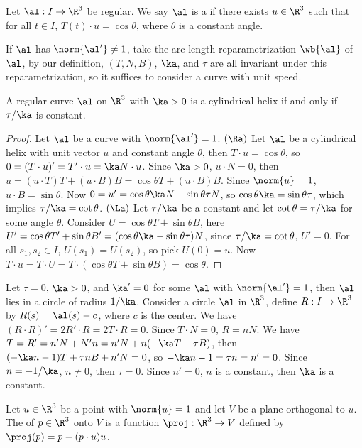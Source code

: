 \documentclass[10pt]{article}
\begin{document}
\begin{definition}
    Let $\al:I\to{\R}^{3}$ be regular. We say $\al$ is a  if there exists $u\in{\R}^{3}$ such that for all $t\in I$, $T(t)\cdot u=\cos\theta$, where $\theta$ is a constant angle.
\end{definition}
\par
If $\al$ has $\norm{\al'}\ne 1$, take the arc-length reparametrization $\wb{\al}$ of $\al$, by our definition, $(T,N,B)$, $\ka$, and $\tau$ are all invariant under this reparametrization, so it suffices to consider a curve with unit speed.
\begin{proposition}
    A regular curve $\al$ on ${\R}^{3}$ with $\ka>0$ is a cylindrical helix if and only if $\tau/\ka$ is constant.
\end{proposition}
\begin{proof}
    Let $\al$ be a curve with $\norm{\al'}=1$. $(\Ra)$ Let $\al$ be a cylindrical helix with unit vector $u$ and constant angle $\theta$, then $T\cdot u=\cos\theta$, so $0=(T\cdot u)'=T'\cdot u=\ka N\cdot u$. Since $\ka>0$, $u\cdot N=0$, then $u=(u\cdot T)T+(u\cdot B)B=\cos\theta T+(u\cdot B)B$. Since $\norm{u}=1$, $u\cdot B=\sin\theta$. Now $0=u'=\cos\theta\ka N-\sin\theta\tau N$, so $\cos\theta\ka=\sin\theta\tau$, which implies $\tau/\ka=\cot\theta$. $(\La)$ Let $\tau/\ka$ be a constant and let $\cot\theta=\tau/\ka$ for some angle $\theta$. Consider $U=\cos\theta T+\sin\theta B$, here $U'=\cos\theta T'+\sin\theta B'=(\cos\theta\ka-\sin\theta\tau)N$, since $\tau/\ka=\cot\theta$, $U'=0$. For all ${s}_{1},{s}_{2}\in I$, $U({s}_{1})=U({s}_{2})$, so pick $U(0)=u$. Now $T\cdot u=T\cdot U=T\cdot(\cos\theta T+\sin\theta B)=\cos\theta$.
\end{proof}
\par
Let $\tau=0$, $\ka>0$, and $\ka'=0$ for some $\al$ with $\norm{\al'}=1$, then $\al$ lies in a circle of radius $1/\ka$. Consider a circle $\al$ in ${\R}^{3}$, define $R:I\to{\R}^{3}$ by $R(s)=\al(s)-c$, where $c$ is the center. We have $(R\cdot R)'=2R'\cdot R=2T\cdot R=0$. Since $T\cdot N=0$, $R=nN$. We have $T=R'=n'N+N'n=n'N+n(-\ka T+\tau B)$, then $(-\ka n-1)T+\tau nB+n'N=0$, so $-\ka n-1=\tau n=n'=0$. Since $n=-1/\ka$, $n\ne 0$, then $\tau=0$. Since $n'=0$, $n$ is a constant, then $\ka$ is a constant.
\begin{definition}
    Let $u\in{\R}^{3}$ be a point with $\norm{u}=1$ and let $V$ be a plane orthogonal to $u$. The  of $p\in{\R}^{3}$ onto $V$ is a function $\proj:{\R}^{3}\to V$ defined by $\proj(p)=p-(p\cdot u)u$.
\end{definition}
\end{document}
